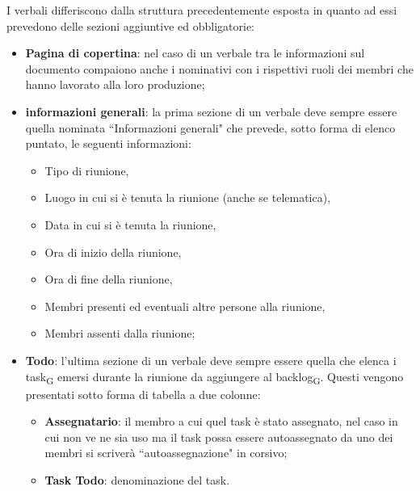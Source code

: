 \label{sec: struttura verbali}
I verbali differiscono dalla struttura precedentemente esposta in quanto ad essi prevedono delle sezioni aggiuntive ed obbligatorie:
\begin{itemize}
    \item \textbf{Pagina di copertina}: nel caso di un verbale tra le informazioni sul documento compaiono anche i nominativi con i rispettivi ruoli dei membri che hanno lavorato alla loro produzione;
    \item \textbf{informazioni generali}: la prima sezione di un verbale deve sempre essere quella nominata ``Informazioni generali" che prevede, sotto forma di elenco puntato, le seguenti informazioni:
        \begin{itemize}
            \item Tipo di riunione,
            \item Luogo in cui si è tenuta la riunione (anche se telematica),
            \item Data in cui si è tenuta la riunione,
            \item Ora di inizio della riunione,
            \item Ora di fine della riunione,
            \item Membri presenti ed eventuali altre persone alla riunione,
            \item Membri assenti dalla riunione;
        \end{itemize}
     \item \textbf{Todo}: l'ultima sezione di un verbale deve sempre essere quella che elenca i task\textsubscript{G} emersi durante la riunione da aggiungere al backlog\textsubscript{G}. Questi vengono presentati sotto forma di tabella a due colonne:
     \begin{itemize}
         \item \textbf{Assegnatario}: il membro a cui quel task è stato assegnato, nel caso in cui non ve ne sia uso ma il task possa essere autoassegnato da uno dei membri si scriverà ``autoassegnazione" in corsivo;
         \item \textbf{Task Todo}: denominazione del task.
     \end{itemize}
     
\end{itemize}


